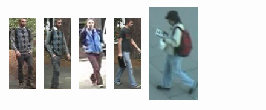 \addtolength{\tabcolsep}{-3pt}

\begin{figure}
\centering
\begin{tabular}{cccc|cccc|cccc}
\includegraphics[height=\reidheight]{Chapters/gradrev/figures/dataset_samples/viper/a/000_45.png}&
\includegraphics[height=\reidheight]{Chapters/gradrev/figures/dataset_samples/viper/b/000_45.png}&
\includegraphics[height=\reidheight]{Chapters/gradrev/figures/dataset_samples/viper/a/001_45.png}&
\includegraphics[height=\reidheight]{Chapters/gradrev/figures/dataset_samples/viper/b/002_90.png}&
\includegraphics[height=\reidheight]{Chapters/gradrev/figures/dataset_samples/PRID/a/img_0001.png}&

\end{tabular}
\end{figure}

